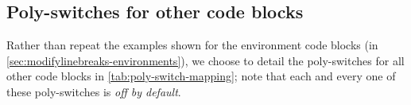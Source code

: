 	\begin{minipage}{.30\linewidth}
	\end{minipage}
	\hfill
	\begin{minipage}{.7\linewidth}
	\end{minipage}

\subsection{Poly-switches for other code blocks}
	Rather than repeat the examples shown for the environment code blocks (in \vref{sec:modifylinebreaks-environments}), we choose to detail the poly-switches for
	all other code blocks in \cref{tab:poly-switch-mapping}; note that each and every one of these poly-switches is \emph{off by default}.

